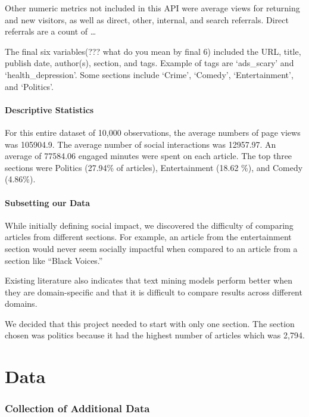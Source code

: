 \documentclass[10pt,letterpaper]{article}
\begin{document}
Other numeric metrics not included in this API were average views for
returning and new visitors, as well as direct, other, internal, and
search referrals. Direct referrals are a count of \ldots{}

The final six variables(??? what do you mean by final 6) included the
URL, title, publish date, author(s), section, and tags. Example of tags
are `ads\_scary' and `health\_depression'. Some sections include
`Crime', `Comedy', `Entertainment', and `Politics'.

\paragraph{Descriptive Statistics}\label{descriptive-statistics}

For this entire dataset of 10,000 observations, the average numbers of
page views was 105904.9. The average number of social interactions was
12957.97. An average of 77584.06 engaged minutes were spent on each
article. The top three sections were Politics (27.94\% of articles),
Entertainment (18.62 \%), and Comedy (4.86\%).

\paragraph{Subsetting our Data}\label{subsetting-our-data}

While initially defining social impact, we discovered the difficulty of
comparing articles from different sections. For example, an article from
the entertainment section would never seem socially impactful when
compared to an article from a section like ``Black Voices.''

Existing literature also indicates that text mining models perform
better when they are domain-specific and that it is difficult to compare
results across different domains.

We decided that this project needed to start with only one section. The
section chosen was politics because it had the highest number of
articles which was 2,794.

\section{Data}\label{data}

\subsubsection{Collection of Additional
Data}\label{collection-of-additional-data}
\end{document}

